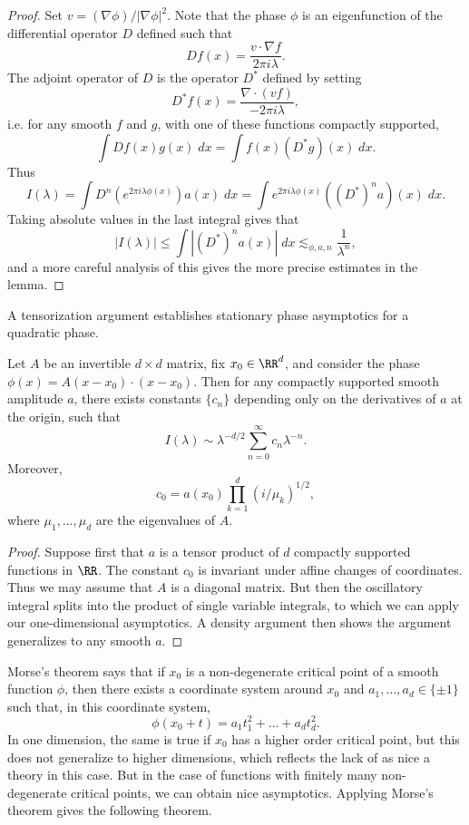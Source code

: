 \begin{proof}
    Set $v = (\nabla \phi)/|\nabla \phi|^2$. Note that the phase $\phi$ is an eigenfunction of the differential operator $D$ defined such that
    \[ Df(x) = \frac{v \cdot \nabla f}{2 \pi i \lambda}. \]
    The adjoint operator of $D$ is the operator $D^*$ defined by setting
    \[ D^*f(x) = \frac{\nabla \cdot (vf)}{-2 \pi i\lambda}, \]
    i.e. for any smooth $f$ and $g$, with one of these functions compactly supported,
    \[ \int Df(x) g(x)\; dx = \int f(x) (D^*g)(x)\; dx. \]
    Thus
    \[ I(\lambda) = \int D^n(e^{2 \pi i \lambda \phi(x)}) a(x)\; dx = \int e^{2 \pi i \lambda \phi(x)} ((D^*)^n a)(x)\; dx. \]
    Taking absolute values in the last integral gives that
    \[ |I(\lambda)| \leq \int |(D^*)^n a(x)|\; dx \lesssim_{\phi,a,n} \frac{1}{\lambda^n}, \]
    and a more careful analysis of this gives the more precise estimates in the lemma.
\end{proof}

A tensorization argument establishes stationary phase asymptotics for a quadratic phase.

\begin{theorem}
  Let $A$ be an invertible $d \times d$ matrix, fix $x_0 \in \RR^d$, and consider the phase $\phi(x) = A(x - x_0) \cdot (x - x_0)$. Then for any compactly supported smooth amplitude $a$, there exists constants $\{ c_n \}$ depending only on the derivatives of $a$ at the origin, such that
  \[ I(\lambda) \sim \lambda^{-d/2} \sum_{n = 0}^\infty c_n \lambda^{-n}. \]
  Moreover,
  \[ c_0 = a(x_0) \prod_{k = 1}^d (i/\mu_k)^{1/2}, \]
  where $\mu_1, \dots, \mu_d$ are the eigenvalues of $A$.
\end{theorem}
\begin{proof}
  Suppose first that $a$ is a tensor product of $d$ compactly supported functions in $\RR$. The constant $c_0$ is invariant under affine changes of coordinates. Thus we may assume that $A$ is a diagonal matrix. But then the oscillatory integral splits into the product of single variable integrals, to which we can apply our one-dimensional asymptotics. A density argument then shows the argument generalizes to any smooth $a$.
\end{proof}

Morse's theorem says that if $x_0$ is a non-degenerate critical point of a smooth function $\phi$, then there exists a coordinate system around $x_0$ and $a_1, \dots, a_d \in \{ \pm 1 \}$ such that, in this coordinate system,
%
\[ \phi(x_0 + t) = a_1 t_1^2 + \dots + a_d t_d^2. \]
%
In one dimension, the same is true if $x_0$ has a higher order critical point, but this does not generalize to higher dimensions, which reflects the lack of as nice a theory in this case. But in the case of functions with finitely many non-degenerate critical points, we can obtain nice asymptotics. Applying Morse's theorem gives the following theorem.

